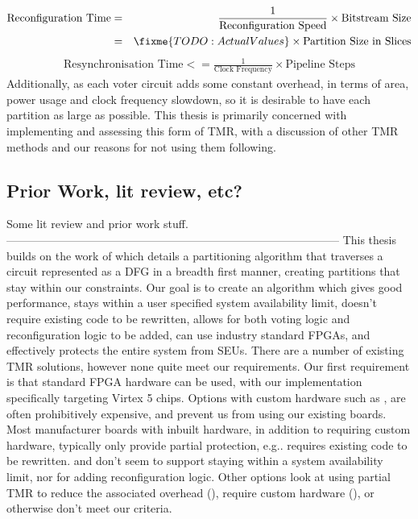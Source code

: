 \documentclass[12pt,drafta4paper,oneside]{memoir} %
\begin{document}
{\begin{eqnarray*}
    \mbox{Reconfiguration Time} &=& \frac{1}{\mbox{Reconfiguration Speed}}\times\mbox{Bitstream Size}\\
     &=& \fixme{TODO: Actual Values}\times\mbox{Partition Size in Slices}
\end{eqnarray*}
\begin{eqnarray*}
    \mbox{Resynchronisation Time} <= \frac{1}{\mbox{Clock Frequency}}\times\mbox{Pipeline Steps}
\end{eqnarray*}
Additionally, as each voter circuit adds some constant overhead, in terms of area, power usage and clock frequency slowdown, so it is desirable to have each partition as large as possible. This thesis is primarily concerned with implementing and assessing this form of \ac{TMR}, with a discussion of other \ac{TMR} methods and our reasons for not using them following.
\subsection{Prior Work, lit review, etc?}
Some lit review and prior work stuff.
-----------------------------------------------------------------------------------------
This thesis builds on the work of  which details a partitioning algorithm that traverses a circuit represented as a \ac{DFG} in a breadth first manner, creating partitions that stay within our constraints.
Our goal is to create an algorithm which gives good performance, stays within a user specified system availability limit, doesn't require existing code to be rewritten, allows for both voting logic and reconfiguration logic to be added, can use industry standard \acp{FPGA}, and effectively protects the entire system from \acp{SEU}. There are a number of existing \ac{TMR} solutions, however none quite meet our requirements.
Our first requirement is that standard \ac{FPGA} hardware can be used, with our implementation specifically targeting Virtex 5 chips. Options with custom hardware such as \cite{VFPGATMR}, are often prohibitively expensive, and prevent us from using our existing boards.
Most manufacturer boards with inbuilt hardware, in addition to requiring custom hardware, typically only provide partial protection, e.g.\cite{Synplify}.
\cite{ftmr} requires existing code to be rewritten.
\cite{synplify} and \cite{tmrtool} don't seem to support staying within a system availability limit, nor for adding reconfiguration logic.
Other options look at using partial \ac{TMR} to reduce the associated overhead (\cite{partialTMR}), require custom hardware (\cite{VFPGATMR}), or otherwise don't meet our criteria.

}
\end{document}

